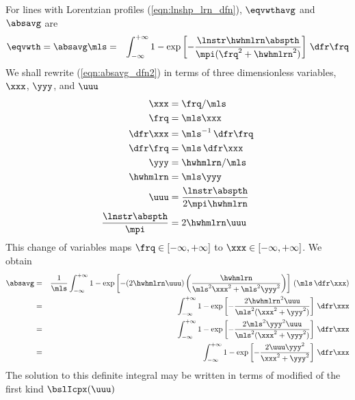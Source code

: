 \documentclass[12pt]{article}
\begin{document}
For lines with Lorentzian profiles (\ref{eqn:lnshp_lrn_dfn}),
$\eqvwthavg$ and $\absavg$ are
\begin{eqnarray}
\eqvwth = \absavg \mls & = & \int_{-\infty}^{+\infty} 
1 - \exp \left[ 
-\frac{\lnstr \hwhmlrn \abspth}{\mpi(\frq^{2} + \hwhmlrn^{2})} 
\right]
\,\dfr\frq
\label{eqn:absavg_dfn2}
\end{eqnarray}
We shall rewrite (\ref{eqn:absavg_dfn2}) in terms of three
dimensionless variables, $\xxx$, $\yyy$, and $\uuu$ 
\begin{subequations}
\label{eqn:absavg_cov}
\begin{align}
\label{eqn:absavg_cov_xxx}
\xxx & = \frq / \mls \\
\frq & = \mls \xxx \nonumber \\
\dfr\xxx & = \mls^{-1} \,\dfr\frq \nonumber \\
\dfr\frq & = \mls \,\dfr\xxx \nonumber \\
\label{eqn:absavg_cov_yyy}
\yyy & = \hwhmlrn / \mls \\
\hwhmlrn & = \mls \yyy \nonumber \\
\label{eqn:absavg_cov_uuu}
\uuu & = \frac{\lnstr \abspth}{2 \mpi \hwhmlrn} \\
\frac{\lnstr \abspth}{\mpi} & = 2 \hwhmlrn \uuu \nonumber
\end{align}
\end{subequations} 
This change of variables maps $\frq \in [-\infty,+\infty]$ to 
$\xxx \in [-\infty,+\infty]$.
We obtain
\begin{eqnarray}
\absavg & = & \frac{1}{\mls} \int_{-\infty}^{+\infty} 
1 - \exp \left[ 
-(2 \hwhmlrn \uuu)
\left(\frac{\hwhmlrn}{\mls^{2} \xxx^{2} + \mls^{2} \yyy^{2}}\right)
\right]
\, (\mls \,\dfr\xxx)
\nonumber \\
& = & \int_{-\infty}^{+\infty} 
1 - \exp \left[ 
-\frac{2 \hwhmlrn^{2} \uuu}{\mls^{2} (\xxx^{2} + \yyy^{2})}
\right]
\,\dfr\xxx
\nonumber \\
& = & \int_{-\infty}^{+\infty} 
1 - \exp \left[ 
-\frac{2 \mls^{2} \yyy^{2} \uuu}{\mls^{2} (\xxx^{2} + \yyy^{2})}
\right]
\,\dfr\xxx
\nonumber \\
& = & \int_{-\infty}^{+\infty} 
1 - \exp \left[ 
-\frac{2 \uuu \yyy^{2}}{\xxx^{2} + \yyy^{2}}
\right]
\,\dfr\xxx
\label{eqn:abs_avg_xy}
\end{eqnarray}
The solution to this definite integral may be written in terms of
modified  of the first kind $\bslIcpx(\uuu)$
\end{document}

